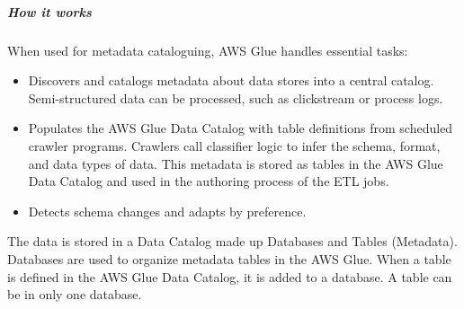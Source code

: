 \documentclass[10pt]{article}
\begin{document}
\subparagraph{How it works}When used for metadata cataloguing, AWS Glue handles essential tasks:
\begin{itemize}
    \item Discovers and catalogs metadata about data stores into a central catalog. Semi-structured data can be processed, such as clickstream or process logs.
    \item Populates the AWS Glue Data Catalog with table definitions from scheduled crawler programs. Crawlers call classifier logic to infer the schema, format, and data types of data. This metadata is stored as tables in the AWS Glue Data Catalog and used in the authoring process of the ETL jobs.
    \item Detects schema changes and adapts by preference.
\end{itemize}
The data is stored in a Data Catalog made up Databases and Tables (Metadata). Databases are used to organize metadata tables in the AWS Glue. When a table is defined in the AWS Glue Data Catalog, it is added to a database. A table can be in only one database. 
\end{document}

